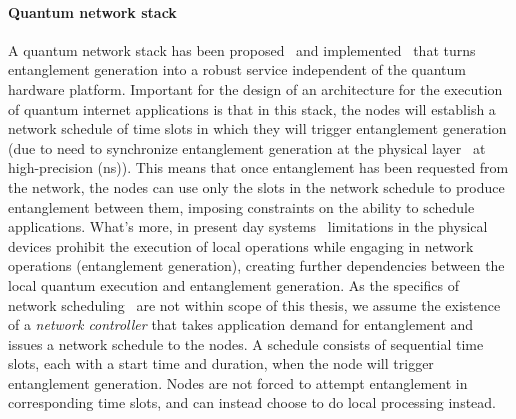 \paragraph{Quantum network stack}
A quantum network stack has been proposed~\cite{dahlberg2019link} and implemented~\cite{pompili2022experimental} that turns entanglement generation into a robust service independent of the quantum hardware platform.
Important for the design of an architecture for the execution of quantum internet applications is that in this stack, the nodes will establish a network schedule of time slots in which they will trigger entanglement generation (due to need to synchronize entanglement generation at the physical layer~\cite{dahlberg2019link} at high-precision (ns)).
This means that once entanglement has been requested from the network, the nodes can use only the slots in the network schedule to produce entanglement between them, imposing constraints on the ability to schedule applications. What's more, in present day systems~\cite{pompili2021realization, krutyanskiy2023entanglement} limitations in the physical devices prohibit the execution of local operations while engaging in network operations (entanglement generation), creating further dependencies between the local quantum execution and entanglement generation. 
As the specifics of network scheduling~\cite{network-scheduling, skrzypczyk2021architecture} are not within scope of this thesis,
we assume the existence of a \textit{network controller} that takes application demand for entanglement and issues a network schedule to the nodes. 
A schedule consists of sequential time slots, each with a start time and duration, when the node will trigger entanglement generation.
Nodes are not forced to attempt entanglement in corresponding time slots, and can instead choose to do local processing instead.


